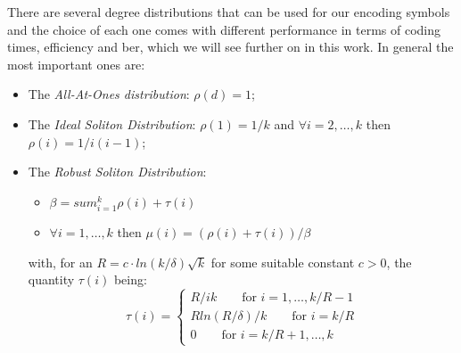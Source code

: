 There are several degree distributions that can be used for our encoding symbols and the choice of each one comes with different performance in terms of coding times, efficiency and \gls{ber}, which we will see further on in this work. In general the most important ones are:
\begin{itemize}
  \item The \textit{All-At-Ones distribution}: $\rho(d) = 1$;
  \item The \textit{Ideal Soliton Distribution}: $\rho(1) = 1/k$ and $\forall i = 2,\dots,k$ then $\rho(i) = 1/i(i-1)$;
  \item The \textit{Robust Soliton Distribution}:
  \begin{itemize}
    \item $\beta  = sum_{i=1}^{k}\rho(i)+\tau(i)$
    \item $\forall i = 1,\dots,k$ then $\mu(i) = (\rho(i)+\tau(i))/\beta$
  \end{itemize}
  with, for an $R = c\cdot ln(k/\delta)\sqrt k$ for some suitable constant $c > 0$, the quantity $\tau(i)$ being:\\
  \[
  \tau(i) =
  \begin{cases}
    R/ik \qquad \text{for } i = 1,\dots,k/R-1\\
    Rln(R/\delta)/k \qquad \text{for } i = k/R\\
    0 \qquad \text{for } i = k/R +1, \dots,k
  \end{cases}
  \]
\end{itemize}
